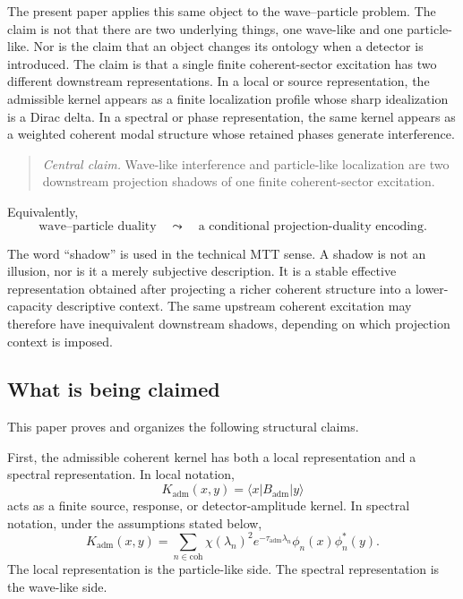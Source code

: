 \documentclass[11pt]{article}
\newcommand{\Kadm}{K_{\mathrm{adm}}}
\newcommand{\Badm}{B_{\mathrm{adm}}}
\newcommand{\ta}{\tau_{\mathrm{adm}}}
\newcommand{\coh}{\mathrm{coh}}
\begin{document}
The present paper applies this same object to the wave--particle problem. The claim is not
that there are two underlying things, one wave-like and one particle-like. Nor is the claim
that an object changes its ontology when a detector is introduced. The claim is that a single
finite coherent-sector excitation has two different downstream representations. In a local
or source representation, the admissible kernel appears as a finite localization profile whose
sharp idealization is a Dirac delta. In a spectral or phase representation, the same kernel
appears as a weighted coherent modal structure whose retained phases generate interference.

\begin{quote}
\emph{Central claim.}
Wave-like interference and particle-like localization are two downstream projection shadows
of one finite coherent-sector excitation.
\end{quote}

Equivalently,
\begin{equation}
  \boxed{
  \text{wave--particle duality}
  \quad\leadsto\quad
  \text{a conditional projection-duality encoding}.
  }
  \label{eq:purpose-projection-duality}
\end{equation}

The word ``shadow'' is used in the technical MTT sense. A shadow is not an illusion, nor is it
a merely subjective description. It is a stable effective representation obtained after projecting
a richer coherent structure into a lower-capacity descriptive context. The same upstream
coherent excitation may therefore have inequivalent downstream shadows, depending on which
projection context is imposed.

\subsection{What is being claimed}
\label{subsec:claimed}

This paper proves and organizes the following structural claims.

First, the admissible coherent kernel has both a local representation and a spectral
representation. In local notation,
\begin{equation}
  \Kadm(x,y)=\langle x|\Badm|y\rangle
\end{equation}
acts as a finite source, response, or detector-amplitude kernel. In spectral notation, under
the assumptions stated below,
\begin{equation}
  \Kadm(x,y)
  =
  \sum_{n\in\coh}
  \chi(\lambda_n)^2 e^{-\ta\lambda_n}
  \phi_n(x)\phi_n^\ast(y).
  \label{eq:purpose-spectral-kernel}
\end{equation}
The local representation is the particle-like side. The spectral representation is the
wave-like side.
\end{document}
